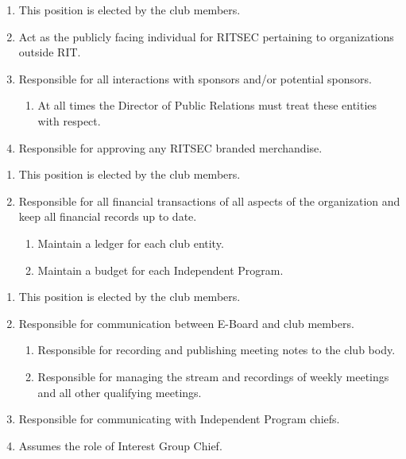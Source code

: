 \begin{enumerate}
  \item This position is elected by the club members.
  \item Act as the publicly facing individual for RITSEC pertaining to
    organizations outside RIT.
  \item Responsible for all interactions with sponsors and/or potential sponsors.
  \begin{enumerate}
    \item At all times the Director of Public Relations must treat these
      entities with respect.
  \end{enumerate}
  \item Responsible for approving any RITSEC branded merchandise.
\end{enumerate}


\begin{enumerate}
  \item This position is elected by the club members.
  \item Responsible for all financial transactions of all aspects of the
    organization and keep all financial records up to date.
  \begin{enumerate}
    \item Maintain a ledger for each club entity.
    \item Maintain a budget for each Independent Program.
  \end{enumerate}
\end{enumerate}


\begin{enumerate}
  \item This position is elected by the club members.
  \item Responsible for communication between E-Board and club members.
  \begin{enumerate}
    \item Responsible for recording and publishing meeting notes to the club
      body.
    \item Responsible for managing the stream and recordings of weekly meetings
      and all other qualifying meetings.
  \end{enumerate}
  \item Responsible for communicating with Independent Program chiefs.
  \item Assumes the role of Interest Group Chief.
\end{enumerate}

